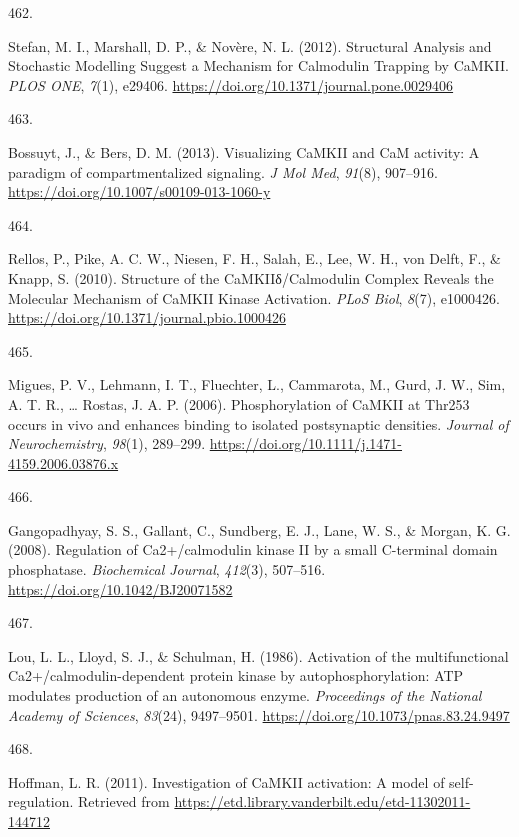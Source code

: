 \documentclass[
  11pt,
  letterpaper,
]{scrreprt}
\newlength{\cslhangindent}
\newlength{\csllabelwidth}
\newenvironment{CSLReferences}[2] %
 {\begin{list}{}{%
  \setlength{\itemindent}{0pt}
  \setlength{\leftmargin}{0pt}
  \setlength{\parsep}{0pt}
  \ifodd #1
   \setlength{\leftmargin}{\cslhangindent}
   \setlength{\itemindent}{-1\cslhangindent}
  \fi
  \setlength{\itemsep}{#2\baselineskip}}}
 {\end{list}}
\newcommand{\CSLLeftMargin}[1]{\parbox[t]{\csllabelwidth}{\strut#1\strut}}
\newcommand{\CSLRightInline}[1]{\parbox[t]{\linewidth - \csllabelwidth}{\strut#1\strut}}
\begin{document}
\begin{CSLReferences}{0}{0}
\CSLLeftMargin{462. }%
\CSLRightInline{Stefan, M. I., Marshall, D. P., \& Novère, N. L. (2012).
Structural {Analysis} and {Stochastic Modelling Suggest} a {Mechanism}
for {Calmodulin Trapping} by {CaMKII}. \emph{PLOS ONE}, \emph{7}(1),
e29406. \url{https://doi.org/10.1371/journal.pone.0029406}}

\CSLLeftMargin{463. }%
\CSLRightInline{Bossuyt, J., \& Bers, D. M. (2013). Visualizing {CaMKII}
and {CaM} activity: A paradigm of compartmentalized signaling. \emph{J
Mol Med}, \emph{91}(8), 907--916.
\url{https://doi.org/10.1007/s00109-013-1060-y}}

\CSLLeftMargin{464. }%
\CSLRightInline{Rellos, P., Pike, A. C. W., Niesen, F. H., Salah, E.,
Lee, W. H., von Delft, F., \& Knapp, S. (2010). Structure of the
{CaMKIIδ}/{Calmodulin Complex Reveals} the {Molecular Mechanism} of
{CaMKII Kinase Activation}. \emph{PLoS Biol}, \emph{8}(7), e1000426.
\url{https://doi.org/10.1371/journal.pbio.1000426}}

\CSLLeftMargin{465. }%
\CSLRightInline{Migues, P. V., Lehmann, I. T., Fluechter, L., Cammarota,
M., Gurd, J. W., Sim, A. T. R., \ldots{} Rostas, J. A. P. (2006).
Phosphorylation of {CaMKII} at {Thr253} occurs in vivo and enhances
binding to isolated postsynaptic densities. \emph{Journal of
Neurochemistry}, \emph{98}(1), 289--299.
\url{https://doi.org/10.1111/j.1471-4159.2006.03876.x}}

\CSLLeftMargin{466. }%
\CSLRightInline{Gangopadhyay, S. S., Gallant, C., Sundberg, E. J., Lane,
W. S., \& Morgan, K. G. (2008). Regulation of {Ca2}+/calmodulin kinase
{II} by a small {C-terminal} domain phosphatase. \emph{Biochemical
Journal}, \emph{412}(3), 507--516.
\url{https://doi.org/10.1042/BJ20071582}}

\CSLLeftMargin{467. }%
\CSLRightInline{Lou, L. L., Lloyd, S. J., \& Schulman, H. (1986).
Activation of the multifunctional {Ca2}+/calmodulin-dependent protein
kinase by autophosphorylation: {ATP} modulates production of an
autonomous enzyme. \emph{Proceedings of the National Academy of
Sciences}, \emph{83}(24), 9497--9501.
\url{https://doi.org/10.1073/pnas.83.24.9497}}

\CSLLeftMargin{468. }%
\CSLRightInline{Hoffman, L. R. (2011). Investigation of {CaMKII}
activation: A model of self-regulation. Retrieved from
\url{https://etd.library.vanderbilt.edu/etd-11302011-144712}}


\end{CSLReferences}
\end{document}

